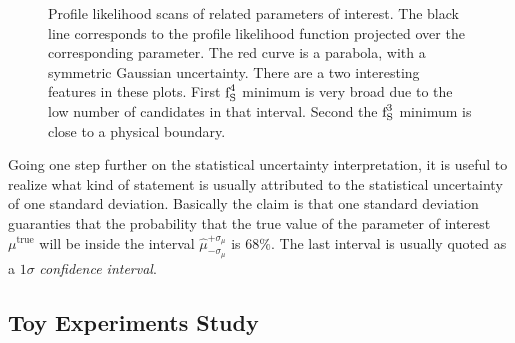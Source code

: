 \begin{figure}[!t]
  \begin{subfigure}{0.5\textwidth}
    \raggedright
    \scalebox{0.56}{}
    \caption{}
    \label{nll_ASMag2_bin3}
  \end{subfigure}%
  \hfill%
  \begin{subfigure}{0.5\textwidth}
    \raggedleft
    \scalebox{0.56}{}
    \caption{}
    \label{nll_ASPhase_bin3}
  \end{subfigure}
  \begin{subfigure}{0.5\textwidth}
    \raggedright
    \scalebox{0.56}{}
    \caption{}
    \label{nll_ASMag2_bin4}
  \end{subfigure}%
  \hfill%
  \begin{subfigure}{0.5\textwidth}
    \raggedleft
    \scalebox{0.56}{}
    \caption{}
    \label{nll_ASPhase_bin4}
  \end{subfigure}
\caption{Profile likelihood scans of \swave related parameters of interest. The black line corresponds to the profile likelihood
         function projected over the corresponding parameter. The red curve is a parabola, with a symmetric Gaussian
         uncertainty. There are a two interesting features in these plots. First $\text{f}_{\text{S}}^{4}$ minimum is very broad due to the
         low number of candidates in that \mkpi interval. Second the $\text{f}_{\text{S}}^{3}$ minimum is close to a physical boundary.}
\end{figure}

Going one step further on the statistical uncertainty interpretation, it is useful to realize what kind of statement is usually
attributed to the statistical uncertainty of one standard deviation. Basically the claim is that one standard deviation
guaranties that the probability that the true value of the parameter of interest $\mu^{\text{true}}$ will be inside the
interval $\hat{\mu}_{-\sigma_\mu}^{+\sigma_\mu}$ is $68\%$. The last interval is usually quoted as a $1\sigma$ {\it confidence interval}.





\subsection{Toy Experiments Study}
\label{Toy_Experiments_Study}

